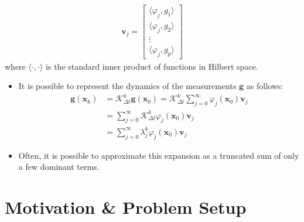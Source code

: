 \documentclass[hyperref={pdfpagemode=FullScreen},aspectratio=169]{beamer}
\begin{document}
\begin{frame}{}
\begin{align}
\mathbf{v}_j = \begin{bmatrix} \langle \varphi_j, g_1 \rangle \\ \langle \varphi_j, g_2 \rangle \\ \vdots \\ \langle \varphi_j, g_p \rangle \end{bmatrix}
\end{align}
where $\langle \cdot , \cdot \rangle$ is the standard inner product of functions in Hilbert space.
\begin{itemize}
\setlength\itemsep{1em}
\item It is possible to represent the dynamics of the measurements $\mathbf{g}$ as follows:
\begin{align}
\mathbf{g}(\mathbf{x}_k) &= \mathcal{K}_{\Delta t}^k \mathbf{g}(\mathbf{x}_0) = \mathcal{K}_{\Delta t}^k \sum_{j=0}^{\infty} \varphi_j(\mathbf{x}_0) \mathbf{v}_j \nonumber \\
&= \sum_{j=0}^{\infty} \mathcal{K}_{\Delta t}^k \varphi_j(\mathbf{x}_0) \mathbf{v}_j \nonumber \\
&= \sum_{j=0}^{\infty} \lambda_j^k \varphi_j(\mathbf{x}_0) \mathbf{v}_j
\end{align}
\item Often, it is possible to approximate this expansion as a truncated sum of only a few dominant terms.
\end{itemize}\end{frame}
\section{Motivation \& Problem Setup}
\end{document}
